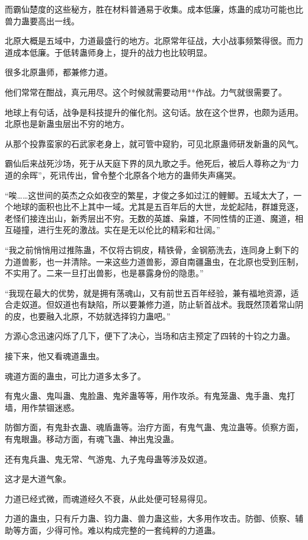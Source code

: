 \begin{this_body}
而霸仙楚度的这些秘方，胜在材料普通易于收集。成本低廉，炼蛊的成功可能也比兽力蛊要高出一线。

北原大概是五域中，力道最盛行的地方。北原常年征战，大小战事频繁得很。而力道成本低廉。于低转蛊师身上，提升的战力也比较明显。

很多北原蛊师，都兼修力道。

他们常常在酣战，真元用尽。这个时候就需要动用**作战。力气就很需要了。

地球上有句话，战争是科技提升的催化剂。这句话。放在这个世界，也颇为适用。北原也是新蛊虫层出不穷的地方。

从那个投靠蛮家的石武家老身上，就可管中窥豹，可见北原蛊师研发新蛊的风气。

霸仙后来战死沙场，死于从天庭下界的凤九歌之手。他死后，被后人尊称之为“力道的余晖”，死讯传出，曾令整个北原各个地方的蛊师失声痛哭。

“唉……这世间的英杰之众如夜空的繁星，才俊之多如过江的鲤鲫。五域太大了，一个地球的面积也比不上其中一域。尤其是五百年后的大世，龙蛇起陆，群雄竞逐，老怪们接连出山，新秀层出不穷。无数的英雄、枭雄，不同性情的正道、魔道，相互碰撞，进行生死的激战。实在是无以伦比的精彩和壮阔。”

“我之前悄悄用过推陈蛊，不仅将古铜皮，精铁骨，金钢筋洗去，连同身上剩下的力道兽影，也一并清除。一来这些力道兽影，源自南疆蛊虫，在北原也受到压制，不实用了。二来一旦打出兽影，也是暴露身份的隐患。”

“我现在最大的优势，就是拥有荡魂山，又有前世五百年经验，兼有福地资源，适合走奴道。但奴道也有缺陷，所以要兼修力道，防止斩首战术。我既然顶着常山阴的皮，也要融入北原，不妨就选择钧力蛊吧。”

方源心念迅速闪烁了几下，便下了决心，当场和店主预定了四转的十钧之力蛊。

接下来，他又看魂道蛊虫。

魂道方面的蛊虫，可比力道多太多了。

有鬼火蛊、鬼叫蛊、鬼脸蛊、鬼斧蛊等等，用作攻杀。有鬼笼蛊、鬼手蛊、鬼打墙，用作禁锢迷惑。

防御方面，有鬼卦衣蛊、魂盾蛊等。治疗方面，有鬼气蛊、鬼泣蛊等。侦察方面，有鬼眼蛊。移动方面，有魂飞蛊、神出鬼没蛊。

还有鬼兵蛊、鬼无常、气游鬼、九子鬼母蛊等涉及奴道。

这才是大道气象。

力道已经式微，而魂道经久不衰，从此处便可轻易得见。

力道的蛊虫，只有斤力蛊、钧力蛊、兽力蛊这些，大多用作攻击。防御、侦察、辅助等方面，少得可怜。难以构成完整的一套纯粹的力道蛊。


\end{this_body}

